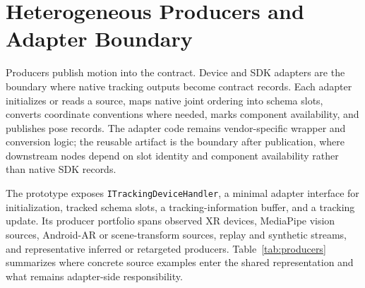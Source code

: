 \documentclass[runningheads]{llncs}
\begin{document}
\section{Heterogeneous Producers and Adapter Boundary}\label{sec:adapters}
Producers publish motion into the contract. Device and SDK adapters are the boundary where native tracking outputs become contract records. Each adapter initializes or reads a source, maps native joint ordering into schema slots, converts coordinate conventions where needed, marks component availability, and publishes pose records. The adapter code remains vendor-specific wrapper and conversion logic; the reusable artifact is the boundary after publication, where downstream nodes depend on slot identity and component availability rather than native SDK records.

The prototype exposes \texttt{ITrackingDeviceHandler}, a minimal adapter interface for initialization, tracked schema slots, a tracking-information buffer, and a tracking update. Its producer portfolio spans observed XR devices, MediaPipe vision sources, Android-AR or scene-transform sources, replay and synthetic streams, and representative inferred or retargeted producers. Table~\ref{tab:producers} summarizes where concrete source examples enter the shared representation and what remains adapter-side responsibility.
\end{document}
